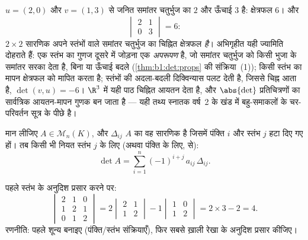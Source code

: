 \begin{example}[सारणिक क्षेत्रफल के रूप में]
\label{ex:b1:det:area}
$u = (2, 0)$ और $v = (1, 3)$ से जनित समांतर चतुर्भुज का  $2$ और ऊँचाई
$3$ है: क्षेत्रफल $6$। और
\[
\begin{vmatrix} 2 & 1\\ 0 & 3\end{vmatrix} = 6 :
\]
$2\times2$ सारणिक अपने स्तंभों वाले समांतर चतुर्भुज का चिह्नित क्षेत्रफल
\emph{है}। अभिगृहीत यही ज्यामिति दोहराते हैं: एक स्तंभ का गुणज दूसरे में
जोड़ना एक \emph{अपरूपण} है, जो समांतर चतुर्भुज को किसी भुजा के समांतर सरका
देता है, बिना  या ऊँचाई बदले (\cref{thm:b1:det:props} की संक्रिया~(1));
किसी स्तंभ का मापन क्षेत्रफल को मापित करता है; स्तंभों की अदला-बदली
दिक्विन्यास पलट देती है, जिससे चिह्न आता है, $\det(v, u) = -6$। $\R^3$ में
यही पाठ चिह्नित आयतन देता है, और $\abs{\det}$  प्रतिचित्रणों का
सार्वत्रिक आयतन-मापन गुणक बन जाता है --- यही तथ्य स्नातक वर्ष~2 के खंड में
बहु-समाकलों के चर-परिवर्तन सूत्र के पीछे है।
\end{example}

\begin{theorem}\label{thm:b1:det:cofactor}
मान लीजिए $A \in \mathcal{M}_n(K)$, और $\Delta_{ij}$ $A$ का वह सारणिक है
जिसमें पंक्ति $i$ और स्तंभ $j$ हटा दिए गए हों। तब किसी भी नियत स्तंभ $j$ के
लिए (अथवा पंक्ति के लिए,  से):
\[
\det A = \sum_{i=1}^{n} (-1)^{i+j}\, a_{ij}\, \Delta_{ij} .
\]
\end{theorem}
\admitted

\begin{example}\label{ex:b1:det:cofactor}
पहले स्तंभ के अनुदिश प्रसार करने पर:
\[
\begin{vmatrix}
2 & 1 & 0\\
1 & 2 & 1\\
0 & 1 & 2
\end{vmatrix}
= 2\begin{vmatrix} 2 & 1\\ 1 & 2\end{vmatrix}
- 1\begin{vmatrix} 1 & 0\\ 1 & 2\end{vmatrix}
= 2 \times 3 - 2 = 4 .
\]
रणनीति: पहले शून्य बनाइए (पंक्ति/स्तंभ संक्रियाएँ), फिर सबसे ख़ाली रेखा के
अनुदिश प्रसार कीजिए।
\end{example}

